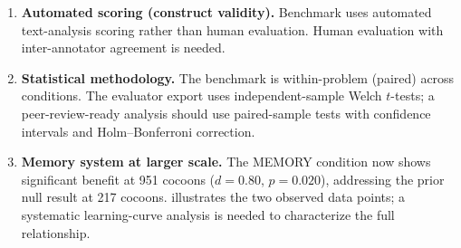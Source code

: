 \documentclass[11pt,a4paper]{article}
\begin{document}
\begin{enumerate}[leftmargin=*]
  \item \textbf{Automated scoring (construct validity).} Benchmark uses
    automated text-analysis scoring rather than human evaluation. Human
    evaluation with inter-annotator agreement is needed.
  \item \textbf{Statistical methodology.} The benchmark is within-problem
    (paired) across conditions. The evaluator export uses independent-sample
    Welch $t$-tests; a peer-review-ready analysis should use paired-sample
    tests with confidence intervals and Holm--Bonferroni correction.
  \item \textbf{Memory system at larger scale.} The MEMORY condition now shows
    significant benefit at 951 cocoons ($d=0.80$, $p=0.020$), addressing the
    prior null result at 217 cocoons.  illustrates the
    two observed data points; a systematic learning-curve analysis is needed
    to characterize the full relationship.


\end{enumerate}
\end{document}
